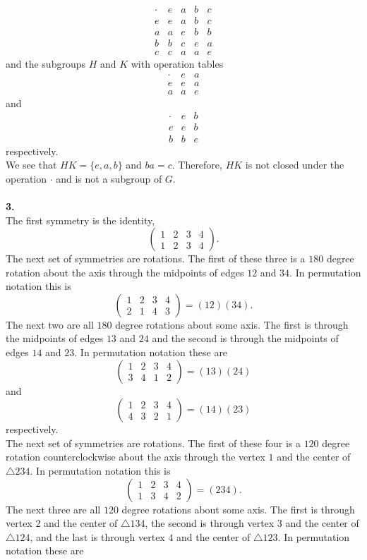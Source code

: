 \documentclass[11pt,a4paper]{article}
\begin{document}
\[
\begin{array}{c|c|c|c|c}
\cdot & e & a & b & c \\ \hline
e & e & a & b & c \\ \hline
a & a & e & b & b \\ \hline
b & b & c & e & a \\ \hline
c & c & a & a & e
\end{array} 
\]
and the subgroups $H$ and $K$ with operation tables 
\[
\begin{array}{c|c|c}
\cdot & e & a \\ \hline
e & e & a \\ \hline
a & a & e
\end{array} 
\]
and
\[
\begin{array}{c|c|c}
\cdot & e & b \\ \hline
e & e & b \\ \hline
b & b & e
\end{array} 
\]
respectively.\\
We see that $HK = \{e,a,b\}$ and $ba = c$. Therefore, $HK$ is not closed under the operation $\cdot$ and is not a subgroup of $G$.\\
~\\
{\bf 3.}\\
The first symmetry is the identity, \[\begin{pmatrix}1&2&3&4\\1&2&3&4\end{pmatrix}.\]
The next set of symmetries are rotations. The first of these three is a $180$ degree rotation about the axis through the midpoints of edges $12$ and $34$. In permutation notation this is \[\begin{pmatrix}1&2&3&4\\2&1&4&3\end{pmatrix} = (12)(34).\] The next two are all $180$ degree rotations about some axis. The first is through the midpoints of edges $13$ and $24$ and the second is through the midpoints of edges $14$ and $23$. In permutation notation these are 
\[\begin{pmatrix}1&2&3&4\\3&4&1&2\end{pmatrix} = (13)(24)\] 
and
\[\begin{pmatrix}1&2&3&4\\4&3&2&1\end{pmatrix} = (14)(23)\] 
respectively.\\
The next set of symmetries are rotations. The first of these four is a $120$ degree rotation counterclockwise about the axis through the vertex $1$ and the center of $\triangle 234$. In permutation notation this is \[\begin{pmatrix}1&2&3&4\\1&3&4&2\end{pmatrix} = (234).\] The next three are all $120$ degree rotations about some axis. The first is through vertex $2$ and the center of $\triangle 134$, the second is through vertex $3$ and the center of $\triangle 124$, and the last is through vertex $4$ and the center of $\triangle 123$. In permutation notation these are
\end{document}
